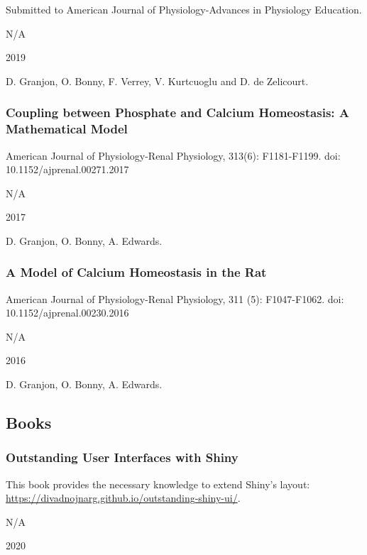 \documentclass[
]{article}
\begin{document}
Submitted to American Journal of Physiology-Advances in Physiology
Education.

N/A

2019

D. Granjon, O. Bonny, F. Verrey, V. Kurtcuoglu and D. de Zelicourt.

\hypertarget{coupling-between-phosphate-and-calcium-homeostasis-a-mathematical-model}{%
\subsubsection{Coupling between Phosphate and Calcium Homeostasis: A
Mathematical
Model}\label{coupling-between-phosphate-and-calcium-homeostasis-a-mathematical-model}}

American Journal of Physiology-Renal Physiology, 313(6): F1181-F1199.
doi: 10.1152/ajprenal.00271.2017

N/A

2017

D. Granjon, O. Bonny, A. Edwards.

\hypertarget{a-model-of-calcium-homeostasis-in-the-rat}{%
\subsubsection{A Model of Calcium Homeostasis in the
Rat}\label{a-model-of-calcium-homeostasis-in-the-rat}}

American Journal of Physiology-Renal Physiology, 311 (5): F1047-F1062.
doi: 10.1152/ajprenal.00230.2016

N/A

2016

D. Granjon, O. Bonny, A. Edwards.

\hypertarget{books}{%
\subsection{Books}\label{books}}

\hypertarget{outstanding-user-interfaces-with-shiny}{%
\subsubsection{Outstanding User Interfaces with
Shiny}\label{outstanding-user-interfaces-with-shiny}}

This book provides the necessary knowledge to extend Shiny's layout:
\url{https://divadnojnarg.github.io/outstanding-shiny-ui/}.

N/A

2020
\end{document}
